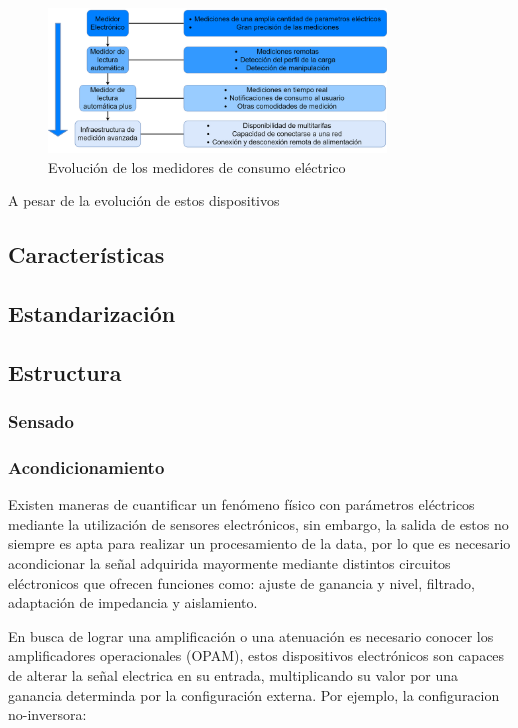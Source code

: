   \begin{figure}[H]
    \centering
    \includegraphics[width=0.8\textwidth]{../Imagenes/Evolucion_medidores.png}
    \caption{Evolución de los medidores de consumo eléctrico}
    \label{fig:Evol_MI}
  \end{figure}

  \par A pesar de la evolución de estos dispositivos


  \subsection{Características}

  \subsection{Estandarización}

  \subsection{Estructura}
    \subsubsection{Sensado}
    \subsubsection{Acondicionamiento}
      \par Existen maneras de cuantificar un fenómeno físico con parámetros eléctricos
      mediante la utilización de sensores electrónicos, sin embargo, la salida de estos
      no siempre es apta para realizar un procesamiento de la data, por lo que es necesario
      acondicionar la señal adquirida mayormente mediante distintos circuitos eléctronicos
      que ofrecen funciones como: ajuste de ganancia y nivel, filtrado, adaptación de impedancia
      y aislamiento.


      \par En busca de lograr una amplificación o una atenuación es necesario conocer
      los amplificadores operacionales (OPAM), estos dispositivos electrónicos son capaces
      de alterar la señal electrica en su entrada, multiplicando su valor por una ganancia
      determinda por la configuración externa. Por ejemplo, la configuracion no-inversora:

